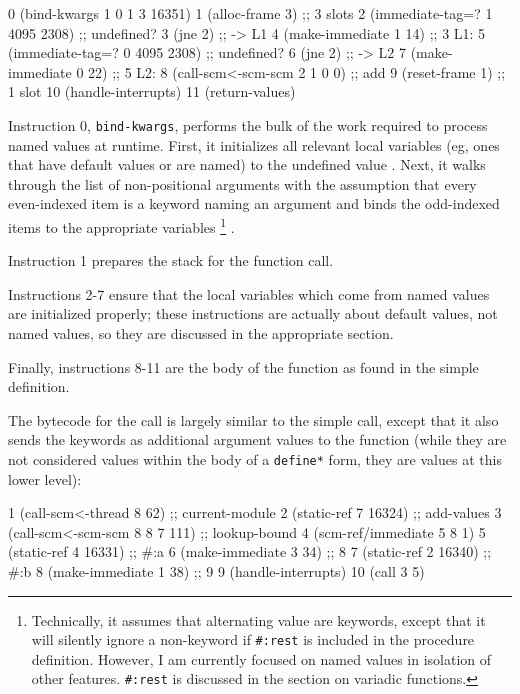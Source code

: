 \begin{pygmented}[lang=lisp]
   0    (bind-kwargs 1 0 1 3 16351)     
   1    (alloc-frame 3)                 ;; 3 slots
   2    (immediate-tag=? 1 4095 2308)   ;; undefined?
   3    (jne 2)                         ;; -> L1
   4    (make-immediate 1 14)           ;; 3
L1:
   5    (immediate-tag=? 0 4095 2308)   ;; undefined?
   6    (jne 2)                         ;; -> L2
   7    (make-immediate 0 22)           ;; 5
L2:
   8    (call-scm<-scm-scm 2 1 0 0)     ;; add
   9    (reset-frame 1)                 ;; 1 slot
  10    (handle-interrupts)             
  11    (return-values)                 
\end{pygmented}

Instruction 0, \texttt{bind-kwargs}, performs the bulk of the work required to process
named values at runtime.
First, it initializes all relevant local variables (eg, ones that have default values or
are named) to the undefined value
\parencite[][libguile/vm.c lines 995-998]{guile-source}.
Next, it walks through the list of non-positional arguments with the assumption that every
even-indexed item is a keyword naming an argument and binds the odd-indexed items to the
appropriate variables
\footnote{
  Technically, it assumes that alternating value are keywords, except that it will
  silently ignore a non-keyword if \texttt{\#:rest} is included in the procedure
  definition.
  However, I am currently focused on named values in isolation of other features.
  \texttt{\#:rest} is discussed in the section on variadic functions.
}
\parencite[][libguile/vm.c lines 1000-1037]{guile-source}.

Instruction 1 prepares the stack for the function call.

Instructions 2-7 ensure that the local variables which come from named values are
initialized properly; these instructions are actually about default values, not named
values, so they are discussed in the appropriate section.

Finally, instructions 8-11 are the body of the function as found in the simple definition.

The bytecode for the call is largely similar to the simple call, except that it also
sends the keywords as additional argument values to the function (while they are not
considered values within the body of a \texttt{define*} form, they are values at this
lower level):

\begin{pygmented}[lang=lisp]
 1 (call-scm<-thread 8 62)         ;; current-module
 2 (static-ref 7 16324)            ;; add-values
 3 (call-scm<-scm-scm 8 8 7 111)   ;; lookup-bound
 4 (scm-ref/immediate 5 8 1)
 5 (static-ref 4 16331)            ;; #:a
 6 (make-immediate 3 34)           ;; 8
 7 (static-ref 2 16340)            ;; #:b
 8 (make-immediate 1 38)           ;; 9
 9 (handle-interrupts)
10 (call 3 5)
\end{pygmented}

